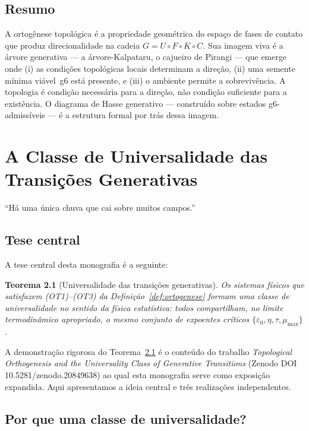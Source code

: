 \documentclass[12pt,a4paper,twoside]{book}
\theoremstyle{plain}
\newtheorem{teorema}{Teorema}[section]
\theoremstyle{definition}
\theoremstyle{definition}
\newcommand{\epsz}{\varepsilon_{0}}
\newcommand{\tribo}{\eta}
\begin{document}
\section{Resumo}

A ortogênese topológica é a propriedade geométrica do espaço de fases
de contato que produz direcionalidade na cadeia $G = U \circ F \circ K \circ C$.
Sua imagem viva é a árvore generativa --- a árvore-Kalpataru, o cajueiro
de Pirangi --- que emerge onde (i) as condições topológicas locais
determinam a direção, (ii) uma semente mínima viável~g6 está presente,
e (iii) o ambiente permite a sobrevivência. A topologia é condição
necessária para a direção, não condição suficiente para a existência.
O diagrama de Hasse generativo --- construído sobre estados g6-admissíveis
--- é a estrutura formal por trás dessa imagem.

\chapter{A Classe de Universalidade das Transições Generativas}
\label{cap:universalidade}

\epigraph{``Há uma única chuva que cai sobre muitos campos.''}{}

\section{Tese central}

A tese central desta monografia é a seguinte:

\begin{teorema}[Universalidade das transições generativas]
\label{thm:universalidade}
Os sistemas físicos que satisfazem (OT1)--(OT3) da
Definição~\ref{def:ortogenese} formam uma \emph{classe de universalidade}
no sentido da física estatística: todos compartilham, no limite
termodinâmico apropriado, o mesmo conjunto de expoentes críticos
$\{\epsz, \tribo, \tau, \mu_{\max}\}$.
\end{teorema}

A demonstração rigorosa do Teorema~\ref{thm:universalidade} é o conteúdo
do trabalho \emph{Topological Orthogenesis and the Universality Class
of Generative Transitions} (Zenodo DOI 10.5281/zenodo.20849638) ao qual
esta monografia serve como exposição expandida. Aqui apresentamos a
ideia central e três realizações independentes.

\section{Por que uma classe de universalidade?}
\end{document}
